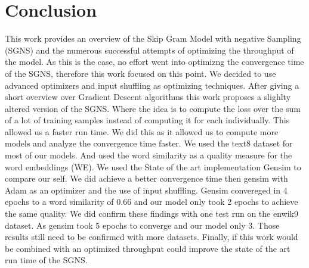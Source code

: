 \chapter{Conclusion}\label{chap:conclusion}

This work provides an overview of the Skip Gram Model with negative Sampling (SGNS) and the numerous successful attempts of optimizing the throughput of the model. As this is the case, no effort went into optimizng the convergence time of the SGNS, therefore this work focused on this point. We decided to use advanced optimizers and input shuffling as optimizing techniques. After giving a short overview over Gradient Descent algorithms this work proposes a slighlty altered version of the SGNS. Where the idea is to compute the loss over the sum of a lot of training samples instead of computing it for each individually. This allowed us a faster run time. We did this as it allowed us to compute more models and analyze the convergence time faster. We used the text8 dataset for most of our models. And used the word similarity as a quality measure for the word embeddings (WE). We used the State of the art implementation Gensim to compare our self. We did achieve a better convergence time then gensim with Adam as an optimizer and the use of input shuffling. Gensim convereged in 4 epochs to a word similarity of 0.66 and our model only took 2 epochs to achieve the same quality. We did confirm these findings with one test run on the enwik9 dataset. As gensim took 5 epochs to converge and our model only 3. Those results still need to be confirmed with more datasets. Finally, if this work would be combined with an optimized throughput could improve the state of the art run time of the SGNS.